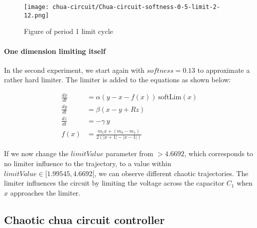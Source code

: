 \documentclass[main]{subfiles}
\begin{document}
\begin{figure}[H]
\centering
\texttt{[image: chua-circuit/Chua-circuit-softness-0-5-limit-2-12.png]}
\caption[Figure of period 1 limit cycle]{Figure of period 1 limit cycle}
\label{figure:chaotictrajectories}
\end{figure}

\paragraph{One dimension limiting itself} In the second experiment, we start again with \(softness=0.13\) to approximate a rather hard limiter. The limiter is added to the equations as shown below:

\begin{align*}
\frac{dx}{dt}&=\alpha (y-x-f(x)) ~ \text{softLim}(x)\\
\frac{dy}{dt}&=\beta (x-y + Rz)\\
\frac{dz}{dt}&=-\gamma ~ y\\
f (x) &= \frac{m_1 x + (m_0 - m_1)}{2 (| x + 1 | -| x - 1 |)}
\end{align*}

If we now change the $limitValue$ parameter from \(>4.6692\), which corresponds to no limiter influence to the trajectory, to a value within \(limitValue \in [1.99545,4.6692[\), we can observe different chaotic trajectories. The limiter influences the circuit by limiting the voltage across the capacitor \(C_1\) when \(x\) approaches the limiter.

\subsection{Chaotic chua circuit controller}
\end{document}
